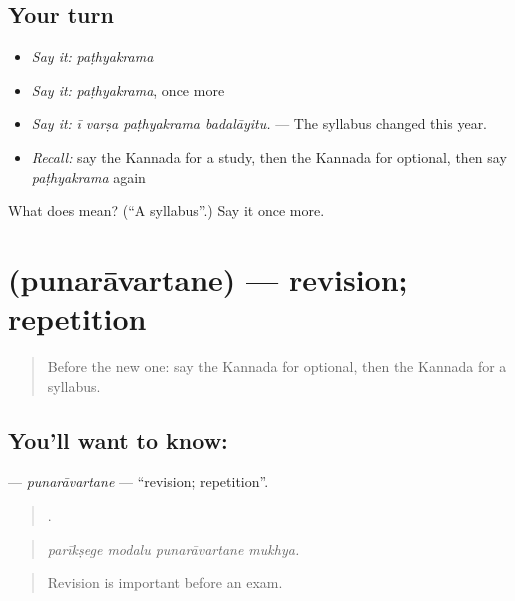 \subsection*{Your turn}
\begin{itemize}
\raggedright
  \item \emph{Say it:} \emph{paṭhyakrama}
  \item \emph{Say it:} \emph{paṭhyakrama}, once more
  \item \emph{Say it:} \emph{ī varṣa paṭhyakrama badalāyitu.} — The syllabus changed this year.
  \item \emph{Recall:} say the Kannada for a study, then the Kannada for optional, then say \emph{paṭhyakrama} again
\end{itemize}

\begin{tcolorbox}[breakable,colback=teal!4,colframe=teal!35!black,title={Before you move on}]
What does  mean? (\textquotedblleft{}A syllabus\textquotedblright{}.) Say it once more.
\end{tcolorbox}
\section[\texorpdfstring{\kn{ಪುನರಾವರ್ತನೆ} (punarāvartane)}{ಪುನರಾವರ್ತನೆ (punarāvartane)}]{ (punarāvartane) — revision; repetition}

\label{lesson:KA-C408-punaravartane}



\begin{quote}
Before the new one: say the Kannada for optional, then the Kannada for a syllabus.
\end{quote}

\subsection*{You'll want to know: }
\textbf{} — \emph{punarāvartane} — \textquotedblleft{}revision; repetition\textquotedblright{}.

\begin{quote}
   .
\end{quote}

\begin{quote}
\emph{parīkṣege modalu punarāvartane mukhya.}
\end{quote}

\begin{quote}
Revision is important before an exam.
\end{quote}

